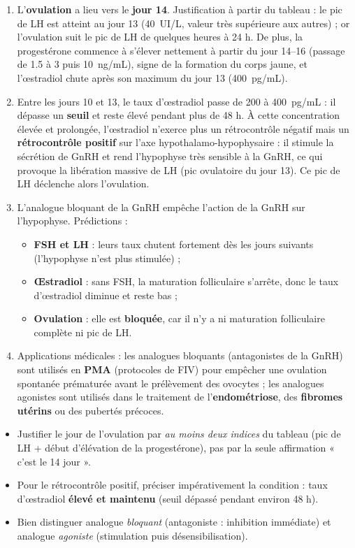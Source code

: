 \documentclass[11pt]{article}
\begin{document}
\begin{corrige}
\begin{enumerate}
\item L'\textbf{ovulation} a lieu vers le \textbf{jour 14}. Justification à partir du tableau : le pic de LH est atteint au jour 13 (\SI{40}{UI/L}, valeur très supérieure aux autres) ; or l'ovulation suit le pic de LH de quelques heures à 24 h. De plus, la progestérone commence à s'élever nettement à partir du jour 14--16 (passage de \SI{1,5}{} à \SI{3}{} puis \SI{10}{ng/mL}), signe de la formation du corps jaune, et l'œstradiol chute après son maximum du jour 13 (\SI{400}{pg/mL}).
\item Entre les jours 10 et 13, le taux d'œstradiol passe de \SI{200}{} à \SI{400}{pg/mL} : il dépasse un \textbf{seuil} et reste élevé pendant plus de 48 h. À cette concentration élevée et prolongée, l'œstradiol n'exerce plus un rétrocontrôle négatif mais un \textbf{rétrocontrôle positif} sur l'axe hypothalamo-hypophysaire : il stimule la sécrétion de GnRH et rend l'hypophyse très sensible à la GnRH, ce qui provoque la libération massive de LH (pic ovulatoire du jour 13). Ce pic de LH déclenche alors l'ovulation.
\item L'analogue bloquant de la GnRH empêche l'action de la GnRH sur l'hypophyse. Prédictions :
\begin{itemize}
\item \textbf{FSH et LH} : leurs taux chutent fortement dès les jours suivants (l'hypophyse n'est plus stimulée) ;
\item \textbf{Œstradiol} : sans FSH, la maturation folliculaire s'arrête, donc le taux d'œstradiol diminue et reste bas ;
\item \textbf{Ovulation} : elle est \textbf{bloquée}, car il n'y a ni maturation folliculaire complète ni pic de LH.
\end{itemize}
\item Applications médicales : les analogues bloquants (antagonistes de la GnRH) sont utilisés en \textbf{PMA} (protocoles de FIV) pour empêcher une ovulation spontanée prématurée avant le prélèvement des ovocytes ; les analogues agonistes sont utilisés dans le traitement de l'\textbf{endométriose}, des \textbf{fibromes utérins} ou des pubertés précoces.
\end{enumerate}
\end{corrige}

\begin{attention}
\begin{itemize}
\item Justifier le jour de l'ovulation par \emph{au moins deux indices} du tableau (pic de LH + début d'élévation de la progestérone), pas par la seule affirmation « c'est le 14\ieme{} jour ».
\item Pour le rétrocontrôle positif, préciser impérativement la condition : taux d'œstradiol \textbf{élevé et maintenu} (seuil dépassé pendant environ 48 h).
\item Bien distinguer analogue \emph{bloquant} (antagoniste : inhibition immédiate) et analogue \emph{agoniste} (stimulation puis désensibilisation).
\end{itemize}
\end{attention}
\end{document}
